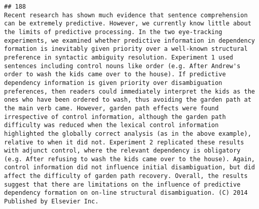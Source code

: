 \documentclass[
  english,
  man]{apa6}
\begin{document}
\begin{verbatim}
## 188                                                                                                                                                                                                                                                                                                                                                                                                                                                                                                                                                                                                                                                                                                                                                                                                                                                                                                                                                                                                                                                                                                                                 Recent research has shown much evidence that sentence comprehension can be extremely predictive. However, we currently know little about the limits of predictive processing. In the two eye-tracking experiments, we examined whether predictive information in dependency formation is inevitably given priority over a well-known structural preference in syntactic ambiguity resolution. Experiment 1 used sentences including control nouns like order (e.g. After Andrew's order to wash the kids came over to the house). If predictive dependency information is given priority over disambiguation preferences, then readers could immediately interpret the kids as the ones who have been ordered to wash, thus avoiding the garden path at the main verb came. However, garden path effects were found irrespective of control information, although the garden path difficulty was reduced when the lexical control information highlighted the globally correct analysis (as in the above example), relative to when it did not. Experiment 2 replicated these results with adjunct control, where the relevant dependency is obligatory (e.g. After refusing to wash the kids came over to the house). Again, control information did not influence initial disambiguation, but did affect the difficulty of garden path recovery. Overall, the results suggest that there are limitations on the influence of predictive dependency formation on on-line structural disambiguation. (C) 2014 Published by Elsevier Inc.

\end{verbatim}
\end{document}
